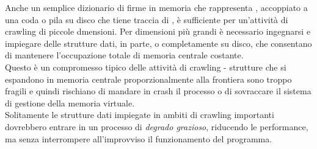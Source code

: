 Anche un semplice dizionario di firme in memoria che rappresenta , accoppiato a una coda o pila su disco che tiene traccia di , è sufficiente per un'attività di crawling di piccole dmensioni. Per dimensioni più grandi è necessario ingegnarsi e impiegare delle strutture dati, in parte, o completamente su disco, che consentano di mantenere l'occupazione totale di memoria centrale costante.\\
Questo è un compromesso tipico delle attività di crawling - strutture che si espandono in memoria centrale proporzionalmente alla frontiera sono troppo fragili e quindi rischiano di mandare in crash il processo o di sovraccare il sistema di gestione della memoria virtuale.\\
Solitamente le strutture dati impiegate in ambiti di crawling importanti dovrebbero entrare in un processo di \textit{degrado grazioso}, riducendo le performance, ma senza interrompere all'improvviso il funzionamento del programma.

